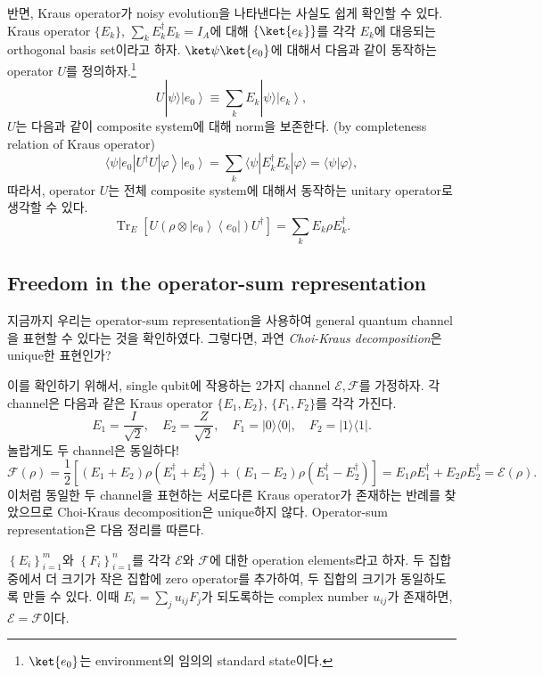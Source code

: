 반면, Kraus operator가 noisy evolution을 나타낸다는 사실도 쉽게 확인할 수 있다. Kraus operator $\{E_k\}$, $\sum_k E_k^\dagger E_k = I_A$에 대해 $\{\ket{e_k}\}$를 각각 $E_k$에 대응되는 orthogonal basis set이라고 하자. 
$\ket \psi \ket{e_0}$에 대해서 다음과 같이 동작하는 operator $U$를 정의하자.\footnote{$\ket{e_0}$는 environment의 임의의 standard state이다.}
\begin{equation*}
    U|\psi\rangle\left|e_0\right\rangle \equiv \sum_k E_k|\psi\rangle\left|e_k\right\rangle,
\end{equation*}
$U$는 다음과 같이 composite system에 대해 norm을 보존한다. (by completeness relation of Kraus operator)
\begin{equation*}
    \left.\langle\psi| e_0\left|U^{\dagger} U\right| \varphi\right\rangle\left|e_0\right\rangle=\sum_k\langle\psi| E_k^{\dagger} E_k|\varphi\rangle=\langle\psi | \varphi\rangle,
\end{equation*}
따라서, operator $U$는 전체 composite system에 대해서 동작하는 unitary operator로 생각할 수 있다.
\begin{equation*}
    \operatorname{Tr}_E\left[U\left(\rho \otimes\left|e_0\right\rangle\left\langle e_0\right|\right) U^{\dagger}\right]=\sum_k E_k \rho E_k^{\dagger} .
\end{equation*}

\subsection{Freedom in the operator-sum representation}
지금까지 우리는 operator-sum representation을 사용하여 general quantum channel을 표현할 수 있다는 것을 확인하였다. 그렇다면, 과연 \textit{Choi-Kraus decomposition}은 unique한 표현인가?

이를 확인하기 위해서, single qubit에 작용하는 2가지 channel $\mathcal E, \mathcal F$를 가정하자. 각 channel은 다음과 같은 Kraus operator $\{E_1, E_2\}$, $\{F_1, F_2\}$를 각각 가진다.
\begin{equation*}
    E_1=\frac{I}{\sqrt{2}}, \quad E_2=\frac{Z}{\sqrt{2}}, \quad F_1=|0\rangle\langle 0|, \quad F_2=|1\rangle\langle 1| .
\end{equation*}
놀랍게도 두 channel은 동일하다!
\begin{equation*}
    \mathcal{F}(\rho)=\frac{1}{2}\left[(E_1+E_2) \rho(E_1^{\dagger}+E_2^{\dagger})+(E_1-E_2) \rho(E_1^{\dagger}-E_2^{\dagger})\right ]= E_1 \rho E_1^{\dagger}+E_2 \rho E_2^{\dagger}=\mathcal{E}(\rho) .
\end{equation*}
이처럼 동일한 두 channel을 표현하는 서로다른 Kraus operator가 존재하는 반례를 찾았으므로 Choi-Kraus decomposition은 unique하지 않다. Operator-sum representation은 다음 정리를 따른다.
\begin{theorem}\label{thm:unique-of-Kraus-operator}
    $\left\{E_i\right\}_{i=1}^m$와 $\left\{F_i\right\}_{i=1}^n$를 각각 $\mathcal{E}$와 $\mathcal{F}$에 대한 operation elements라고 하자. 두 집합 중에서 더 크기가 작은 집합에 zero operator를 추가하여, 두 집합의 크기가 동일하도록 만들 수 있다. 이때 $E_i = \sum_j u_{i j} F_j$가 되도록하는 complex number $u_{ij}$가 존재하면, $\mathcal{E}=\mathcal{F}$이다.
\end{theorem}


